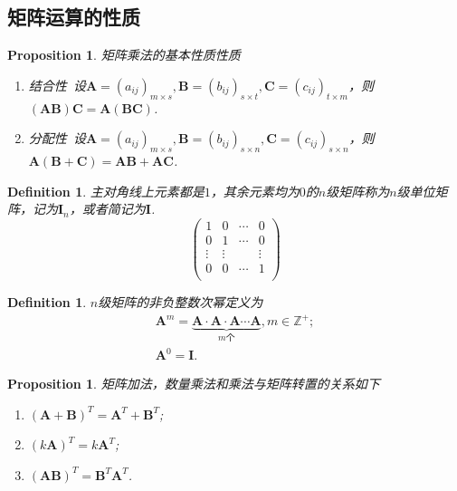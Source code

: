\documentclass{article}
\newtheorem{proposition}[theorem]{Proposition}
\newtheorem{definition}[theorem]{Definition}
\newcommand{\mbf}[1]{\bm{#1}}
\begin{document}
\subsection{矩阵运算的性质}

\begin{proposition}
\rm {\color{red}矩阵乘法的基本性质性质}
\begin{enumerate}
	\item 结合性\ 设$\mbf{A}=(a_{ij})_{m \times s},\mbf{B}=(b_{ij})_{s \times t},\mbf{C}=(c_{ij})_{t\times m}$，则$(\mbf{A}\mbf{B})\mbf{C} = \mbf{A}(\mbf{B}\mbf{C})$.
	\item 分配性\ 设$\mbf{A}=(a_{ij})_{m \times s},\mbf{B}=(b_{ij})_{s \times n},\mbf{C}=(c_{ij})_{s\times n}$，则$\mbf{A}(\mbf{B} + \mbf{C}) = \mbf{A}\mbf{B} + \mbf{A}\mbf{C}$.
\end{enumerate}
\end{proposition}

\begin{definition}
\rm 主对角线上元素都是$1$，其余元素均为$0$的$n$级矩阵称为$n$级单位矩阵，记为$\mbf{I}_n$，或者简记为$\mbf{I}$.
$$
\begin{pmatrix}
1 & 0 & \cdots & 0 \\
0 & 1 & \cdots & 0 \\
\vdots & \vdots & & \vdots \\
0 & 0 &\cdots & 1 \\
\end{pmatrix}
$$
\end{definition}

\begin{definition}
\rm $n$级矩阵的非负整数次幂定义为
$$
\begin{array}{ll}
\mbf{A}^m = \underbrace{\mbf{A} \cdot \mbf{A} \cdot \mbf{A} \cdots \mbf{A} }_{m\text{个}}, m \in \mathbb{Z}^+;\\
\mbf{A}^0 = \mbf{I}.
\end{array}
$$
\end{definition}

\begin{proposition}
\rm 矩阵加法，数量乘法和乘法与矩阵转置的关系如下
\begin{enumerate}
	\item $(\mbf{A} + \mbf{B})^T = \mbf{A}^T + \mbf{B}^T$;
	\item $(k\mbf{A})^T = k\mbf{A}^T$;
	\item $(\mbf{A}\mbf{B})^T = \mbf{B}^T \mbf{A}^T$.
\end{enumerate}
\end{proposition}
\end{document}
